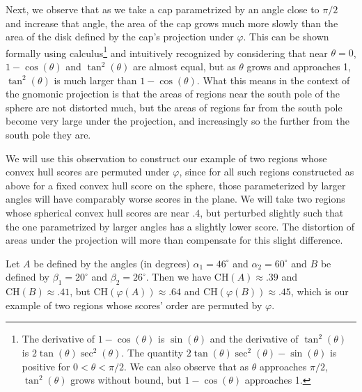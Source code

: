 {\begin{example}
  Next, we observe that as we take a cap parametrized by an angle close
  to $\pi/2$ and increase that angle, the area of the cap grows much
  more slowly than the area of the disk defined by the cap's projection
  under $\varphi$.  This can be shown formally using
  calculus\footnote{The derivative of $1-\cos(\theta)$ is $\sin(\theta)$
  and the derivative of $\tan^2(\theta)$ is
  $2\tan(\theta)\sec^2(\theta)$.  The quantity
  $2\tan(\theta)\sec^2(\theta)-\sin(\theta)$ is positive for
  $0<\theta<\pi/2$.  We can also observe that as $\theta$ approaches
  $\pi/2$, $\tan^2(\theta)$ grows without bound, but $1-\cos(\theta)$
  approaches 1.} and intuitively recognized by considering that near
  $\theta=0$, $1-\cos(\theta)$ and $\tan^2(\theta)$ are almost equal,
  but as $\theta$ grows and approaches 1, $\tan^2(\theta)$ is much
  larger than $1-\cos(\theta)$.  What this means in the context of the
  gnomonic projection is that the areas of regions near the south pole
  of the sphere are not distorted much, but the areas of regions far
  from the south pole become very large under the projection, and
  increasingly so the further from the south pole they are. 

  We will use this observation to construct our example of two regions
  whose convex hull scores are permuted under $\varphi$, since for all
  such regions constructed as above for a fixed convex hull score on the
  sphere, those parameterized by larger angles will have comparably
  worse scores in the plane.  We will take two regions whose spherical
  convex hull scores are near $.4$, but perturbed slightly such that the
  one parametrized by larger angles has a slightly lower score.  The
  distortion of areas under the projection will more than compensate for
  this slight difference.


  Let $A$ be defined by the angles (in degrees) $\alpha_1=46^\circ$ and
  $\alpha_2=60^\circ$ and $B$ be defined by $\beta_1=20^\circ$ and
  $\beta_2=26^\circ$.  Then we have $\mathrm{CH}(A)\approx .39$ and
  $\mathrm{CH}(B)\approx .41$, but $\mathrm{CH}(\varphi(A))\approx .64$
  and $\mathrm{CH}(\varphi(B))\approx .45$, which is our example of two
  regions whose scores' order are permuted by $\varphi$.
\end{example}


}
